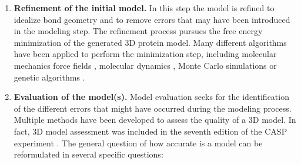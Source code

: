 \documentclass[12pt, b5paper,twoside]{tesi_upf}
\begin{document}
\begin{enumerate}
\item \textbf{Refinement of the initial model.} In this step the model is refined to idealize bond geometry and to remove errors that may have been introduced in the modeling step. The refinement process pursues the free energy minimization of the generated 3D protein model. Many different algorithms have been applied to perform the minimization step, including molecular mechanics force fields \cite{PRO1410}, molecular dynamics \cite{Fiser2000}, Monte Carlo simulations  \cite{Kidera1995} or genetic algorithms \cite{McGarrah1993}.
 
\item \textbf{Evaluation of the model(s).} Model evaluation seeks for the identification of the different errors that might have occurred during the modeling process. Multiple methods have been developed to assess the quality of a 3D model. In fact, 3D model assessment was included in the seventh edition of the CASP experiment \cite{PROT21669}. The general question of how accurate is a model can be reformulated in several specific questions: 




\end{enumerate}
\end{document}
